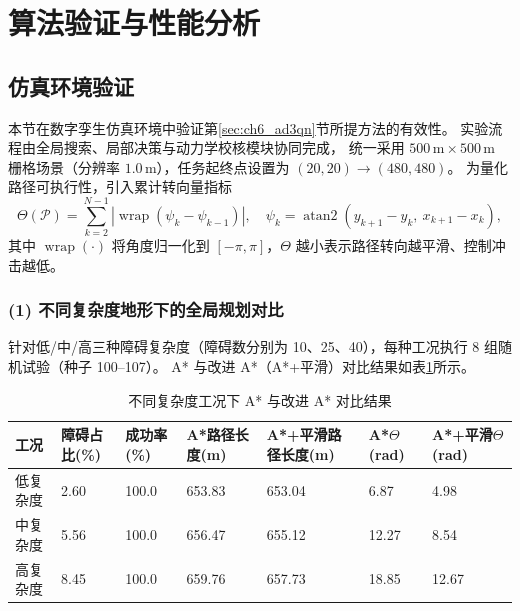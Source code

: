 \section{算法验证与性能分析}
\label{sec:ch6_validation}

\subsection{仿真环境验证}
\label{subsec:ch6_sim_validation}

本节在数字孪生仿真环境中验证第\ref{sec:ch6_ad3qn}节所提方法的有效性。
实验流程由全局搜索、局部决策与动力学校核模块协同完成，
统一采用 $500\,\mathrm{m}\times 500\,\mathrm{m}$ 栅格场景（分辨率 $1.0\,\mathrm{m}$），任务起终点设置为 $(20,20)\rightarrow(480,480)$。
为量化路径可执行性，引入累计转向量指标
\begin{equation}
\Theta(\mathcal{P})=\sum_{k=2}^{N-1}\left|\operatorname{wrap}\left(\psi_k-\psi_{k-1}\right)\right|,\quad
\psi_k=\operatorname{atan2}(y_{k+1}-y_k,\ x_{k+1}-x_k),
\label{eq:ch6_turn_metric}
\end{equation}
其中 $\operatorname{wrap}(\cdot)$ 将角度归一化到 $[-\pi,\pi]$，$\Theta$ 越小表示路径转向越平滑、控制冲击越低。

\subsubsection*{(1) 不同复杂度地形下的全局规划对比}

针对低/中/高三种障碍复杂度（障碍数分别为 10、25、40），每种工况执行 8 组随机试验（种子 100--107）。
A* 与改进 A*（A*+平滑）对比结果如表\ref{tab:ch6_complexity_compare}所示。

\begin{table}[H]
\centering
\small
\caption{不同复杂度工况下 A* 与改进 A* 对比结果}
\label{tab:ch6_complexity_compare}
\setlength{\tabcolsep}{3pt}
\begin{tabular}{p{}p{}p{}p{}p{}p{}p{}}
\toprule
工况 & 障碍占比(\%) & 成功率(\%) & A*路径长度(m) & A*+平滑路径长度(m) & A*$\Theta$(rad) & A*+平滑$\Theta$(rad) \\
\midrule
低复杂度 & 2.60 & 100.0 & 653.83 & 653.04 & 6.87 & 4.98 \\
中复杂度 & 5.56 & 100.0 & 656.47 & 655.12 & 12.27 & 8.54 \\
高复杂度 & 8.45 & 100.0 & 659.76 & 657.73 & 18.85 & 12.67 \\
\bottomrule
\end{tabular}
\end{table}

